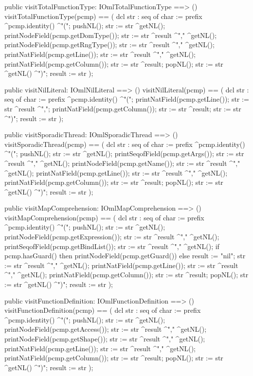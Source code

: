 \begin{vdm_al}
  public visitTotalFunctionType: IOmlTotalFunctionType ==> ()
  visitTotalFunctionType(pcmp) ==
    ( dcl str : seq of char := prefix ^pcmp.identity() ^"(";
      pushNL();
      str := str ^getNL();
      printNodeField(pcmp.getDomType());
      str := str ^result ^"," ^getNL();
      printNodeField(pcmp.getRngType());
      str := str ^result ^"," ^getNL();
      printNatField(pcmp.getLine());
      str := str ^result ^"," ^getNL();
      printNatField(pcmp.getColumn());
      str := str ^result;
      popNL();
      str := str ^getNL() ^")";
      result := str );

  public visitNilLiteral: IOmlNilLiteral ==> ()
  visitNilLiteral(pcmp) ==
    ( dcl str : seq of char := prefix ^pcmp.identity() ^"(";
      printNatField(pcmp.getLine());
      str := str ^result ^",";
      printNatField(pcmp.getColumn());
      str := str ^result;
      str := str ^")";
      result := str );

  public visitSporadicThread: IOmlSporadicThread ==> ()
  visitSporadicThread(pcmp) ==
    ( dcl str : seq of char := prefix ^pcmp.identity() ^"(";
      pushNL();
      str := str ^getNL();
      printSeqofField(pcmp.getArgs());
      str := str ^result ^"," ^getNL();
      printNodeField(pcmp.getName());
      str := str ^result ^"," ^getNL();
      printNatField(pcmp.getLine());
      str := str ^result ^"," ^getNL();
      printNatField(pcmp.getColumn());
      str := str ^result;
      popNL();
      str := str ^getNL() ^")";
      result := str );

  public visitMapComprehension: IOmlMapComprehension ==> ()
  visitMapComprehension(pcmp) ==
    ( dcl str : seq of char := prefix ^pcmp.identity() ^"(";
      pushNL();
      str := str ^getNL();
      printNodeField(pcmp.getExpression());
      str := str ^result ^"," ^getNL();
      printSeqofField(pcmp.getBindList());
      str := str ^result ^"," ^getNL();
      if pcmp.hasGuard()
      then printNodeField(pcmp.getGuard())
      else result := "nil";
      str := str ^result ^"," ^getNL();
      printNatField(pcmp.getLine());
      str := str ^result ^"," ^getNL();
      printNatField(pcmp.getColumn());
      str := str ^result;
      popNL();
      str := str ^getNL() ^")";
      result := str );

  public visitFunctionDefinition: IOmlFunctionDefinition ==> ()
  visitFunctionDefinition(pcmp) ==
    ( dcl str : seq of char := prefix ^pcmp.identity() ^"(";
      pushNL();
      str := str ^getNL();
      printNodeField(pcmp.getAccess());
      str := str ^result ^"," ^getNL();
      printNodeField(pcmp.getShape());
      str := str ^result ^"," ^getNL();
      printNatField(pcmp.getLine());
      str := str ^result ^"," ^getNL();
      printNatField(pcmp.getColumn());
      str := str ^result;
      popNL();
      str := str ^getNL() ^")";
      result := str );


\end{vdm_al}
